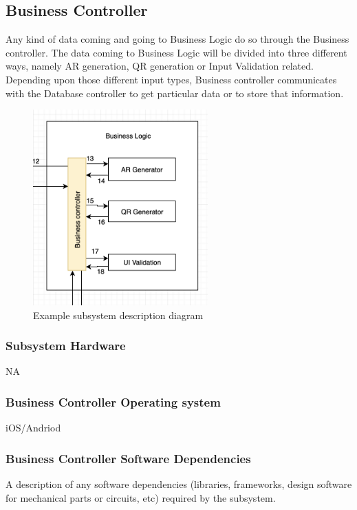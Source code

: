 \subsection{Business Controller}
Any kind of data coming and going to Business Logic do so through the Business controller. The data coming to Business Logic will be divided into three different ways, namely AR generation, QR generation or Input Validation related. Depending upon those different input types, Business controller communicates with the Database controller to get particular data or to store that information.

\begin{figure}[h!]
	\centering
 	\includegraphics[width=0.60\textwidth]{images/businesscontroller}
 \caption{Example subsystem description diagram}
\end{figure}

\subsubsection{Subsystem Hardware}
NA

\subsubsection{Business Controller Operating system}
iOS/Andriod

\subsubsection{Business Controller Software Dependencies}
A description of any software dependencies (libraries, frameworks, design software for mechanical parts or circuits, etc) required by the subsystem.

